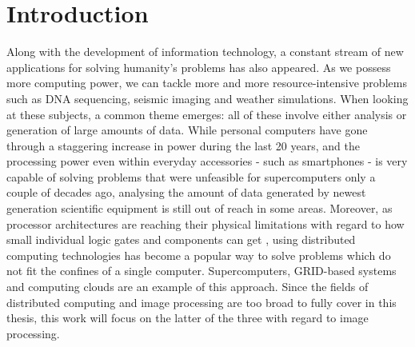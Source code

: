 \documentclass [12pt,a4paper]{report}
\begin{document}
\begin{tiitelleht}



\end{tiitelleht}


\tableofcontents

\chapter{Introduction}

Along with the development of information technology, a constant stream of new applications for solving humanity's problems has also appeared. As we possess more computing power, we can tackle more and more resource-intensive problems such as DNA sequencing, seismic imaging and weather simulations. When looking at these subjects, a common theme emerges: all of these involve either analysis or generation of large amounts of data. While personal computers have gone through a staggering increase in power during the last 20 years, and the processing power even within everyday accessories - such as smartphones - is very capable of solving problems that were unfeasible for supercomputers only a couple of decades ago, analysing the amount of data generated by newest generation scientific equipment is still out of reach in some areas. Moreover, as processor architectures are reaching their physical limitations with regard to how small individual logic gates and components can get , using distributed computing technologies has become a popular way to solve problems which do not fit the confines of a single computer. Supercomputers, GRID-based systems and computing clouds are an example of this approach. Since the fields of distributed computing and image processing are too broad to fully cover in this thesis, this work will focus on the latter of the three with regard to image processing.
\end{document}
